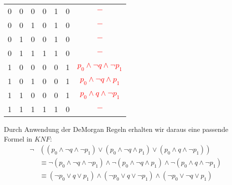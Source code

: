 \begin{example}
\begin{center}
\begin{tabular} {| c | c | c || c | c | c | c |}
            \hline
            0 & 0 & 0 & 0 & 1 & 0 & \textcolor{red}{$-$}\\
            0 & 0 & 1 & 0 & 1 & 0 & \textcolor{red}{$-$}\\
            0 & 1 & 0 & 0 & 1 & 0 & \textcolor{red}{$-$}\\
            0 & 1 & 1 & 1 & 1 & 0 & \textcolor{red}{$-$}\\
            1 & 0 & 0 & 0 & 0 & 1 & \textcolor{red}{$p_0 \land \neg q\land \neg p_1$}\\
            1 & 0 & 1 & 0 & 0 & 1 & \textcolor{red}{$p_0 \land \neg q\land      p_1$}\\
            1 & 1 & 0 & 0 & 0 & 1 & \textcolor{red}{$p_0 \land q\land \neg p_1$}\\
            1 & 1 & 1 & 1 & 1 & 0 & \textcolor{red}{$-$}\\
            \hline
        \end{tabular}
    \end{center}
    \smallskip
    Durch Anwendung der DeMorgan Regeln erhalten wir daraus eine passende Formel in $KNF$:
    \begin{align*}
        \neg&((p_0 \land \neg q\land \neg p_1)\lor
              (p_0 \land \neg q\land p_1)\lor
              (p_0 \land q\land \neg p_1)
            )\\
            &\equiv
              \neg(p_0 \land \neg q\land \neg p_1)\land
              \neg(p_0 \land \neg q\land p_1)\land
              \neg(p_0 \land q\land \neg p_1)\\
            &\equiv
              (\neg p_0 \lor q\lor p_1)\land
              (\neg p_0 \lor q\lor \neg p_1)\land
              (\neg p_0 \lor \neg q\lor p_1)
    \end{align*}
\end{example}
